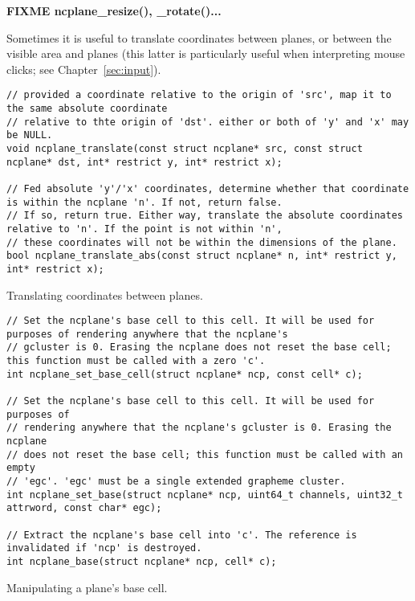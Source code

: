\textbf{FIXME ncplane\_resize(), \_rotate()...}

Sometimes it is useful to translate coordinates between planes, or between the
visible area and planes (this latter is particularly useful when interpreting
mouse clicks; see Chapter~\ref{sec:input}).
\begin{listing}[!htbp]
\begin{verbatim}
// provided a coordinate relative to the origin of 'src', map it to the same absolute coordinate
// relative to thte origin of 'dst'. either or both of 'y' and 'x' may be NULL.
void ncplane_translate(const struct ncplane* src, const struct ncplane* dst, int* restrict y, int* restrict x);

// Fed absolute 'y'/'x' coordinates, determine whether that coordinate is within the ncplane 'n'. If not, return false.
// If so, return true. Either way, translate the absolute coordinates relative to 'n'. If the point is not within 'n',
// these coordinates will not be within the dimensions of the plane.
bool ncplane_translate_abs(const struct ncplane* n, int* restrict y, int* restrict x);
\end{verbatim}
\caption{Translating coordinates between planes.}
\end{listing}

\begin{listing}[!htbp]
\begin{verbatim}
// Set the ncplane's base cell to this cell. It will be used for purposes of rendering anywhere that the ncplane's
// gcluster is 0. Erasing the ncplane does not reset the base cell; this function must be called with a zero 'c'.
int ncplane_set_base_cell(struct ncplane* ncp, const cell* c);

// Set the ncplane's base cell to this cell. It will be used for purposes of
// rendering anywhere that the ncplane's gcluster is 0. Erasing the ncplane
// does not reset the base cell; this function must be called with an empty
// 'egc'. 'egc' must be a single extended grapheme cluster.
int ncplane_set_base(struct ncplane* ncp, uint64_t channels, uint32_t attrword, const char* egc);

// Extract the ncplane's base cell into 'c'. The reference is invalidated if 'ncp' is destroyed.
int ncplane_base(struct ncplane* ncp, cell* c);
\end{verbatim}
\caption{Manipulating a plane's base cell.}
\end{listing}

